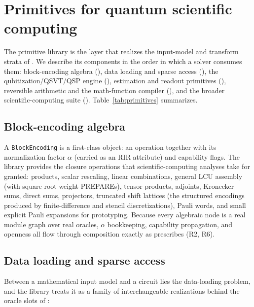 \section{Primitives for quantum scientific computing}
\label{sec:primitives}

The primitive library is the layer that realizes the input-model and
transform strata of .  We describe its components in the
order in which a solver consumes them: block-encoding algebra
(), data loading and sparse access
(), the qubitization/QSVT/QSP engine
(), estimation and readout primitives
(), reversible arithmetic and the math-function
compiler (), and the broader scientific-computing suite
().  Table~\ref{tab:primitives} summarizes.

\subsection{Block-encoding algebra}
\label{sec:be-algebra}

A \texttt{BlockEncoding} is a first-class object: an operation together with
its normalization factor $\alpha$ (carried as an RIR attribute) and
capability flags.  The library provides the closure operations that
scientific-computing analyses take for granted: products, scalar rescaling,
linear combinations, general LCU assembly (with square-root-weight
PREPAREs), tensor products, adjoints, Kronecker sums, direct sums,
projectors, truncated shift lattices (the structured encodings produced by
finite-difference and stencil discretizations), Pauli words, and small
explicit Pauli expansions for prototyping.  Because every algebraic node is
a real module graph over real oracles, $\alpha$ bookkeeping, capability
propagation, and openness all flow through composition exactly as
 prescribes (R2, R6).

\subsection{Data loading and sparse access}
\label{sec:dataloading}

Between a mathematical input model and a circuit lies the data-loading
problem, and the library treats it as a family of interchangeable
realizations behind the oracle slots of :

